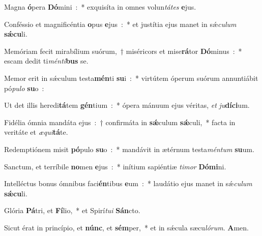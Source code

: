 ﻿\item Magna \textbf{ó}\-pera \textbf{Dó}\-mini~:~* exquisíta in omnes volun\emph{tá}\-\emph{tes} \textbf{e}jus.
\item Conféssio et magnificéntia \textbf{o}\-pus \textbf{e}jus~:~* et justítia ejus manet in sǽ\emph{cu}\-\emph{lum} \textbf{sǽ}\textbf{cu}li.
\item Memóriam fecit mi\-ra\-bí\-li\-um suórum,~† miséricors et mise\textbf{rá}\-tor \textbf{Dó}\-minus~:~* escam dedit ti\emph{mén}\-\emph{ti}\-\textbf{bus} se.
\item Memor erit in sǽculum testa\textbf{mén}\-ti \textbf{su}\-i~:~* virtútem óperum suórum annuntiábit pó\emph{pu}\-\emph{lo} \textbf{su}o~:
\item Ut det illis heredi\textbf{tá}\-tem \textbf{gén}\-tium~:~* ópera mánuum ejus véritas, \emph{et} \emph{ju}\textbf{dí}\textbf{ci}um.
\item Fidélia ómnia mandáta ejus~:~† confirmáta in \textbf{sǽ}\-culum \textbf{sǽ}\-culi,~* facta in veritáte et \emph{æ}\emph{qui}\textbf{tá}te.
\item Redemptiónem misit \textbf{pó}\-pulo \textbf{su}\-o~:~* mandávit in ætérnum testa\emph{mén}\-\emph{tum} \textbf{su}um.
\item Sanctum, et terríbile \textbf{no}\-men \textbf{e}jus~:~* inítium sapiéntiæ \emph{ti}\-\emph{mor} \textbf{Dó}\textbf{mi}ni.
\item Intelléctus bonus ómnibus faci\textbf{én}\-tibus \textbf{e}\-um~:~* laudátio ejus manet in sǽ\emph{cu}\-\emph{lum} \textbf{sǽ}\textbf{cu}li.
\item Glória \textbf{Pá}\-tri, et \textbf{Fí}\-lio,~* et Spirí\emph{tu}\-\emph{i} \textbf{Sán}cto.
\item Sicut érat in princípio, et \textbf{núnc}, et \textbf{sém}\-per,~* et in sǽcula sæcu\emph{ló}\-\emph{rum}. \textbf{A}men.